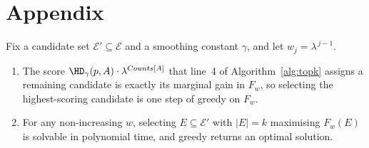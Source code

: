 \section{Appendix}
\label{app:greedy}

\begin{proposition}
\label{prop:greedy-exact}
Fix a candidate set $\mathcal{E}'\subseteq\mathcal{E}$ and a smoothing constant $\gamma$, and let $w_j=\lambda^{\,j-1}$.
\begin{enumerate}[label=(\roman*),leftmargin=*]
\item The score $\HD_\gamma(p,A)\cdot\lambda^{Counts[A]}$ that line~4 of Algorithm~\ref{alg:topk} assigns a remaining candidate is exactly its marginal gain in $F_w$, so selecting the highest-scoring candidate is one step of greedy on $F_w$.
\item For any non-increasing $w$, selecting $E\subseteq\mathcal{E}'$ with $|E|=k$ maximising $F_w(E)$ is solvable in polynomial time, and greedy returns an optimal solution.
\end{enumerate}
\end{proposition}

